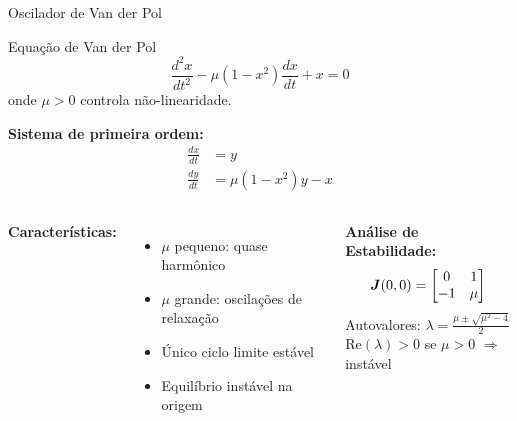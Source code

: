\begin{frame}[allowframebreaks]{Oscilador de Van der Pol}
\begin{block}{Equação de Van der Pol}
\begin{equation*}
\frac{d^2x}{dt^2} - \mu(1 - x^2)\frac{dx}{dt} + x = 0
\end{equation*}
onde $\mu > 0$ controla não-linearidade.

\textbf{Sistema de primeira ordem:}
\begin{align*}
\frac{dx}{dt} &= y\\
\frac{dy}{dt} &= \mu(1 - x^2)y - x
\end{align*}
\end{block}

\vspace{0.3cm}

\begin{columns}
\textbf{Características:}
\begin{itemize}
    \item $\mu$ pequeno: quase harmônico
    \item $\mu$ grande: oscilações de relaxação
    \item Único ciclo limite estável
    \item Equilíbrio instável na origem
\end{itemize}

\textbf{Análise de Estabilidade:}
\begin{equation*}
\boldsymbol{J}(0,0) = \begin{bmatrix}
0 & 1\\
-1 & \mu
\end{bmatrix}
\end{equation*}
Autovalores: $\lambda = \frac{\mu \pm \sqrt{\mu^2 - 4}}{2}$\\
$\text{Re}(\lambda) > 0$ se $\mu > 0$ $\Rightarrow$ instável
\end{columns}
\end{frame}

